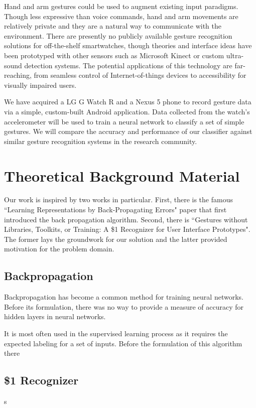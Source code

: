 \documentclass{report}
\begin{document}
Hand and arm gestures could be used to augment existing input paradigms. Though less expressive than voice commands, hand and arm movements are relatively private and they are a natural way to communicate with the environment. There are presently no publicly available gesture recognition solutions for off-the-shelf smartwatches, though theories and interface ideas have been prototyped with other sensors such as Microsoft Kinect or custom ultra-sound detection systems. The potential applications of this technology are far-reaching, from seamless control of Internet-of-things devices to accessibility for visually impaired users.

We have acquired a LG G Watch R and a Nexus 5 phone to record gesture data via a simple, custom-built Android application. Data collected from the watch's accelerometer will be used to train a neural network to classify a set of simple gestures. We will compare the accuracy and performance of our classifier against similar gesture recognition systems in the research community.

\section{Theoretical Background Material}
Our work is inspired by two works in particular. First, there is the famous ``Learning Representations by Back-Propagating Errors" paper that first introduced the back propagation algorithm. Second, there is ``Gestures without Libraries, Toolkits, or Training: A \$1 Recognizer for User Interface Prototypes". The former lays the groundwork for our solution and the latter provided motivation for the problem domain.

\subsection{Backpropagation}

Backpropagation has become a common method for training neural networks. Before its formulation,  there was no way to provide a measure of accuracy for hidden layers in neural networks.

It is most often used in the supervised learning process as it requires the expected labeling for a set of inputs.  Before the formulation of this algorithm there

\subsection{\$1 Recognizer}s
\end{document}
